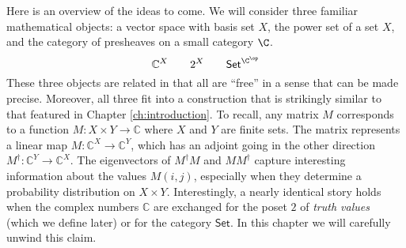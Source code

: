 Here is an overview of the ideas to come. We will consider three familiar mathematical objects: a vector space with basis set $X$, the power set of a set $X$, and the category of presheaves on a small category $\C$.
\[\mathbb{C}^X \qquad 2^X \qquad \mathsf{Set}^{\C^{\op}}\]
These three objects are related in that all are ``free'' in a sense that can be made precise. Moreover, all three fit into a construction that is strikingly similar to that featured in Chapter \ref{ch:introduction}. To recall, any matrix $M$ corresponds to a function $M\colon X\times Y\to \mathbb{C}$ where $X$ and $Y$ are finite sets. The matrix represents a linear map  $M\colon \mathbb{C}^X\to \mathbb{C}^Y$, which has an adjoint going in the other direction $M^\dagger \colon \mathbb{C}^Y\to\mathbb{C}^X$. The eigenvectors of $M^\dagger M$ and $MM^\dagger$ capture interesting  information about the values $M(i,j)$, especially when they determine a probability distribution on $X\times Y.$ Interestingly, a nearly identical story holds when the complex numbers $\mathbb{C}$ are exchanged for the poset $2$ of \textit{truth values}  (which we define later) or for the category $\mathsf{Set}$. In this chapter we will carefully unwind this claim. 

